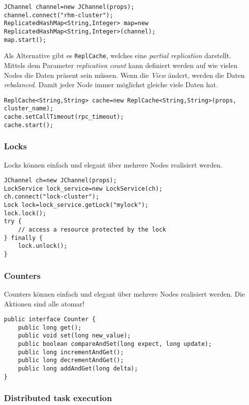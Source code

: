 \begin{lstlisting}
JChannel channel=new JChannel(props);
channel.connect("rhm-cluster");
ReplicatedHashMap<String,Integer> map=new ReplicatedHashMap<String,Integer>(channel);
map.start();
\end{lstlisting}

Als Alternative gibt es \verb|ReplCache|, welches eine \emph{partial replication} darstellt. Mittels dem Parameter \emph{replication count} kann definiert werden auf wie vielen Nodes die Daten präsent sein müssen. Wenn die \emph{View} ändert, werden die Daten \emph{rebalanced}. Damit jeder Node immer möglichst gleiche viele Daten hat.
	
\begin{lstlisting}
ReplCache<String,String> cache=new ReplCache<String,String>(props, cluster_name);
cache.setCallTimeout(rpc_timeout);
cache.start();
\end{lstlisting}

\subsubsection{Locks} 

Locks können einfach und elegant über mehrere Nodes realisiert werden.
	
\begin{lstlisting}
JChannel ch=new JChannel(props);
LockService lock_service=new LockService(ch);
ch.connect("lock-cluster");
Lock lock=lock_service.getLock("mylock");
lock.lock();
try {
	// access a resource protected by the lock
} finally {
	lock.unlock();
}
\end{lstlisting}

\subsubsection{Counters}

Counters können einfach und elegant über mehrere Nodes realisiert werden. Die Aktionen sind alle atomar!
	
\begin{lstlisting}
public interface Counter {
	public long get();
	public void set(long new_value);
	public boolean compareAndSet(long expect, long update);
	public long incrementAndGet();
	public long decrementAndGet();
	public long addAndGet(long delta);
}
\end{lstlisting}
	
\subsubsection{Distributed task execution} 

